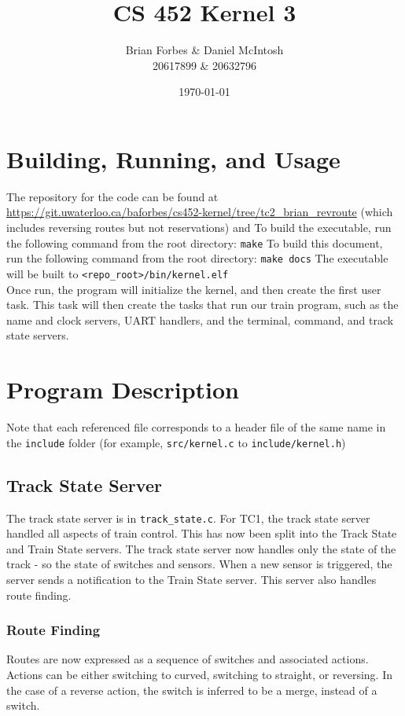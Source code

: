 \documentclass{article}
\begin{document}
\title{CS 452 Kernel 3}
\author{Brian Forbes \& Daniel McIntosh \\ 20617899 \& 20632796}
\date{\today}

\maketitle

\section{ Building, Running, and Usage }

The repository for the code can be found at \url{https://git.uwaterloo.ca/baforbes/cs452-kernel/tree/tc2\_brian\_revroute} (which includes reversing routes but not reservations) and %
To build the executable, run the following command from the root directory: \verb|make|
To build this document, run the following command from the root directory: \verb|make docs|
The executable will be built to \verb|<repo_root>/bin/kernel.elf|\\

Once run, the program will initialize the kernel, and then create the first user task. This task will then create the tasks that run our train program, such as the name and clock servers, UART handlers, and the terminal, command, and track state servers.

\section{Program Description}
Note that each referenced file corresponds to a header file of the same name in the \verb|include| folder (for example, \verb|src/kernel.c| to \verb|include/kernel.h|)

\subsection{ Track State Server}
The track state server is in \verb|track_state.c|.
For TC1, the track state server handled all aspects of train control. This has now been split into the Track State and Train State servers. The track state server now handles only the state of the track - so the state of switches and sensors. When a new sensor is triggered, the server sends a notification to the Train State server. This server also handles route finding.
\subsubsection{ Route Finding }
Routes are now expressed as a sequence of switches and associated actions. Actions can be either switching to curved, switching to straight, or reversing. In the case of a reverse action, the switch is inferred to be a merge, instead of a switch.
\end{document}
